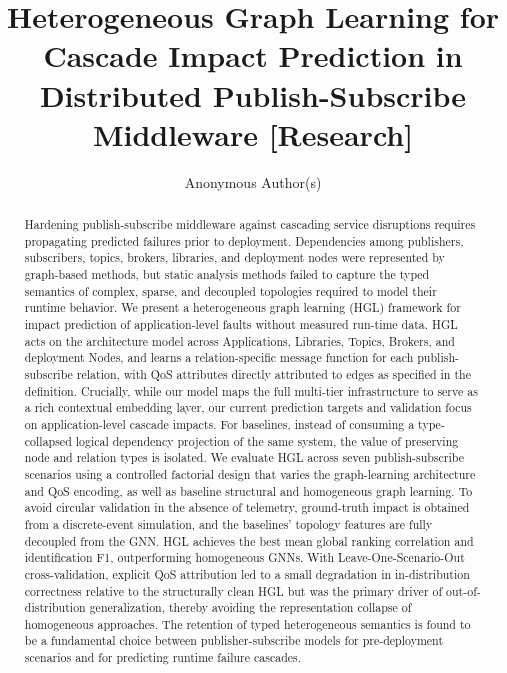 \documentclass[sigconf,9pt,anonymous]{acmart}
\begin{document}
\title{Heterogeneous Graph Learning for Cascade Impact Prediction in Distributed Publish-Subscribe Middleware [Research]}

\author{Anonymous Author(s)}

\begin{abstract}
Hardening publish-subscribe middleware against cascading service disruptions requires propagating predicted failures prior to deployment. Dependencies among publishers, subscribers, topics, brokers, libraries, and deployment nodes were represented by graph-based methods, but static analysis methods failed to capture the typed semantics of complex, sparse, and decoupled topologies required to model their runtime behavior. We present a heterogeneous graph learning (HGL) framework for impact prediction of application-level faults without measured run-time data. HGL acts on the architecture model across Applications, Libraries, Topics, Brokers, and deployment Nodes, and learns a relation-specific message function for each publish-subscribe relation, with QoS attributes directly attributed to edges as specified in the definition. Crucially, while our model maps the full multi-tier infrastructure to serve as a rich contextual embedding layer, our current prediction targets and validation focus on application-level cascade impacts. For baselines, instead of consuming a type-collapsed logical dependency projection of the same system, the value of preserving node and relation types is isolated. We evaluate HGL across seven publish-subscribe scenarios using a controlled factorial design that varies the graph-learning architecture and QoS encoding, as well as baseline structural and homogeneous graph learning. To avoid circular validation in the absence of telemetry, ground-truth impact is obtained from a discrete-event simulation, and the baselines' topology features are fully decoupled from the GNN. HGL achieves the best mean global ranking correlation and identification F1, outperforming homogeneous GNNs. With Leave-One-Scenario-Out cross-validation, explicit QoS attribution led to a small degradation in in-distribution correctness relative to the structurally clean HGL but was the primary driver of out-of-distribution generalization, thereby avoiding the representation collapse of homogeneous approaches. The retention of typed heterogeneous semantics is found to be a fundamental choice between publisher-subscribe models for pre-deployment scenarios and for predicting runtime failure cascades.
\end{abstract}
\end{document}
